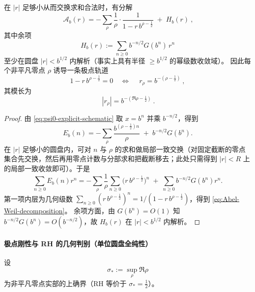 \begin{theorem}\label{thm:discrete-abel-weil-expansion}
在 \(|r|\) 足够小从而交换求和合法时，有分解
\begin{equation}\label{eq:Abel-Weil-decomposition}
\boxed{\ \mathcal A_b(r)
=-\sum_{\rho}\frac{1}{\rho}\cdot\frac{1}{1-r\,b^{\rho-\frac12}}
\;+\;H_b(r)\ },
\end{equation}
其中余项
\[
H_b(r):=\sum_{n\ge 0}b^{-n/2}G(b^n)\,r^n
\]
至少在圆盘 \(|r|<b^{1/2}\) 内解析（事实上具有半径 \(\ge b^{1/2}\) 的幂级数收敛域）。
因此每个非平凡零点 \(\rho\) 诱导一条极点轨道
\[
1-r\,b^{\rho-\frac12}=0
\quad\Longleftrightarrow\quad
\boxed{\ r_\rho=b^{-(\rho-\frac12)}\ },
\]
其模长为
\[
\boxed{\ |r_\rho|=b^{-(\Re\rho-\frac12)}\ }.
\]
\end{theorem}
\begin{proof}
由 \eqref{eq:psi0-explicit-schematic} 取 \(x=b^n\) 并乘 \(b^{-n/2}\)，得到
\[
E_b(n)
=-\sum_\rho \frac{b^{(\rho-\frac12)n}}{\rho}
\;+\;b^{-n/2}G(b^n).
\]
在 \(|r|\) 足够小的圆盘内，可对 \(n\) 与 \(\rho\) 的求和做局部一致交换（对固定截断的零点集合先交换，然后再用零点计数与分部求和把截断移去；此处只需得到 \(|r|<R\) 上的局部一致收敛即可）。于是
\[
\sum_{n\ge 0}E_b(n)r^n
=-\sum_\rho \frac{1}{\rho}\sum_{n\ge 0}\bigl(r\,b^{\rho-\frac12}\bigr)^n
\;+\;\sum_{n\ge 0}b^{-n/2}G(b^n)r^n.
\]
第一项内层为几何级数 \(\sum_{n\ge 0}(r\,b^{\rho-\frac12})^n=1/(1-r\,b^{\rho-\frac12})\)，得到 \eqref{eq:Abel-Weil-decomposition}。
余项方面，由 \(G(b^n)=O(1)\) 知 \(b^{-n/2}G(b^n)=O(b^{-n/2})\)，故 \(H_b(r)\) 在 \(|r|<b^{1/2}\) 内解析。
\end{proof}

\paragraph{极点刚性与 RH 的几何判别（单位圆盘全纯性）}
设
\[
\sigma_*:=\sup_{\rho}\Re\rho
\]
为非平凡零点实部的上确界（RH 等价于 \(\sigma_*=\tfrac12\)）。

